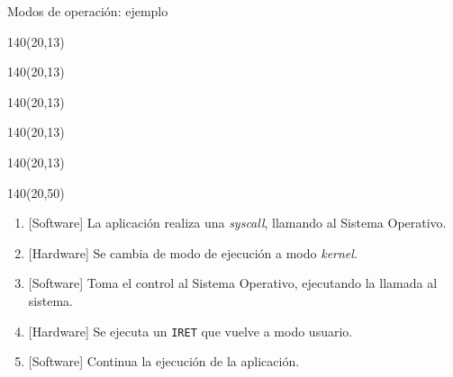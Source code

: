 \documentclass[aspectratio=169]{beamer}
\begin{document}
\begin{frame}{Modos de operación: ejemplo}
    \begin{textblock}{140}(20,13)  \end{textblock}
    \begin{textblock}{140}(20,13)  \end{textblock}
    \begin{textblock}{140}(20,13)  \end{textblock}
    \begin{textblock}{140}(20,13)  \end{textblock}
    \begin{textblock}{140}(20,13)  \end{textblock}
    \begin{textblock}{140}(20,50)
    \begin{enumerate}
    \small
     \item<1-> \textcolor{naranjauca}{[Software]} \hspace{0.09cm} La aplicación realiza una \emph{syscall}, llamando al Sistema Operativo.
     \item<2-> \textcolor{naranjauca}{[Hardware]} Se cambia de modo de ejecución a modo \emph{kernel}.
     \item<3-> \textcolor{naranjauca}{[Software]} \hspace{0.09cm} Toma el control al Sistema Operativo, ejecutando la llamada al sistema.
     \item<4-> \textcolor{naranjauca}{[Hardware]} Se ejecuta un \texttt{IRET} que vuelve a modo usuario.
     \item<5-> \textcolor{naranjauca}{[Software]} \hspace{0.09cm} Continua la ejecución de la aplicación.
    \end{enumerate}
    \end{textblock}
\end{frame}
\end{document}
